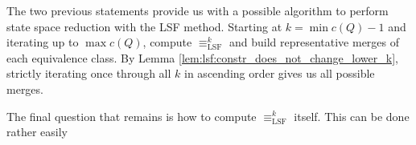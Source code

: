 The two previous statements provide us with a possible algorithm to perform state space reduction with the LSF method. Starting at $k = \min c(Q) - 1$ and iterating up to $\max c(Q)$, compute $\equiv_\text{LSF}^k$ and build representative merges of each equivalence class. By Lemma \ref{lem:lsf:constr_does_not_change_lower_k}, strictly iterating once through all $k$ in ascending order gives us all possible merges.

The final question that remains is how to compute $\equiv_\text{LSF}^k$ itself. This can be done rather easily 




